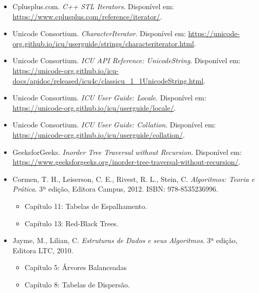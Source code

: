 \documentclass{article}
\begin{document}
\begin{itemize}
    \item Cplusplus.com. \textit{C++ STL Iterators}. Disponível em: \url{https://www.cplusplus.com/reference/iterator/}. 

    \item Unicode Consortium. \textit{CharacterIterator}. Disponível em: \url{https://unicode-org.github.io/icu/userguide/strings/characteriterator.html}.
    
    \item Unicode Consortium. \textit{ICU API Reference: UnicodeString}. Disponível em: \url{https://unicode-org.github.io/icu-docs/apidoc/released/icu4c/classicu_1_1UnicodeString.html}.
    
    \item Unicode Consortium. \textit{ICU User Guide: Locale}. Disponível em: \url{https://unicode-org.github.io/icu/userguide/locale/}.
    
    \item Unicode Consortium. \textit{ICU User Guide: Collation}. Disponível em: \url{https://unicode-org.github.io/icu/userguide/collation/}.
    
    \item GeeksforGeeks. \textit{Inorder Tree Traversal without Recursion}. Disponível em: \url{https://www.geeksforgeeks.org/inorder-tree-traversal-without-recursion/}. 

    \item Cormen, T. H., Leiserson, C. E., Rivest, R. L., Stein, C. \textit{Algoritmos: Teoria e Prática}. 3ª edição, Editora Campus, 2012. ISBN: 978-8535236996.
    \begin{itemize}
        \item Capítulo 11: Tabelas de Espalhamento.
        \item Capítulo 13: Red-Black Trees.
    \end{itemize}
    
    \item Jayme, M., Lilian, C. \textit{Estruturas de Dados e seus Algoritmos}. 3ª edição, Editora LTC, 2010. 
    \begin{itemize}
        \item Capítulo 5: Árvores Balanceadas
        \item Capítulo 8: Tabelas de Dispersão.
    \end{itemize}

\end{itemize}
\end{document}
